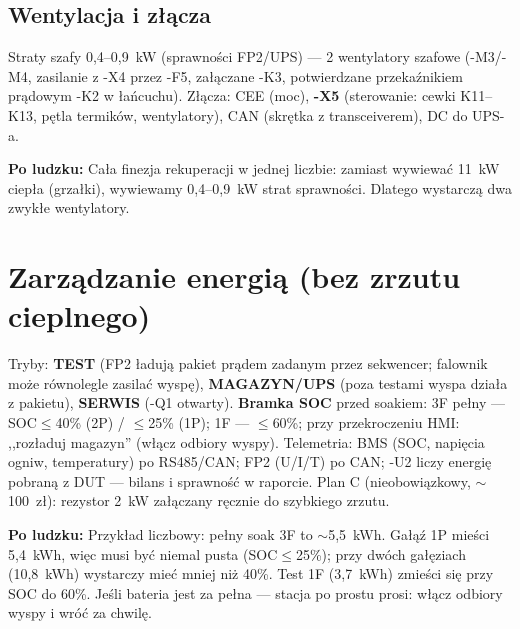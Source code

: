 \documentclass[11pt,a4paper]{article}
\newcommand{\why}[1]{\par\smallskip\noindent\colorbox{blue!6}{\parbox{0.965\linewidth}{\small\textbf{Po ludzku:} #1}}\par\smallskip}
\begin{document}
\subsection{Wentylacja i złącza}
Straty szafy 0,4--0,9~kW (sprawności FP2/UPS) --- 2 wentylatory szafowe (-M3/-M4, zasilanie z -X4
przez -F5, załączane -K3, potwierdzane przekaźnikiem prądowym -K2 w łańcuchu). Złącza: CEE (moc),
\textbf{-X5} (sterowanie: cewki K11--K13, pętla termików, wentylatory), CAN (skrętka
z transceiverem), DC do UPS-a.
\why{Cała finezja rekuperacji w jednej liczbie: zamiast wywiewać 11~kW ciepła (grzałki),
wywiewamy 0,4--0,9~kW strat sprawności. Dlatego wystarczą dwa zwykłe wentylatory.}

\section{Zarządzanie energią (bez zrzutu cieplnego)}
Tryby: \textbf{TEST} (FP2 ładują pakiet prądem zadanym przez sekwencer; falownik może równolegle
zasilać wyspę), \textbf{MAGAZYN/UPS} (poza testami wyspa działa z pakietu), \textbf{SERWIS}
(-Q1 otwarty). \textbf{Bramka SOC} przed soakiem: 3F pełny --- SOC$\le$40\% (2P) / $\le$25\% (1P);
1F --- $\le$60\%; przy przekroczeniu HMI: ,,rozładuj magazyn'' (włącz odbiory wyspy). Telemetria:
BMS (SOC, napięcia ogniw, temperatury) po RS485/CAN; FP2 (U/I/T) po CAN; -U2 liczy energię pobraną
z DUT --- bilans i sprawność w raporcie. Plan C (nieobowiązkowy, $\sim$100~zł): rezystor 2~kW
załączany ręcznie do szybkiego zrzutu.
\why{Przykład liczbowy: pełny soak 3F to $\sim$5,5~kWh. Gałąź 1P mieści 5,4~kWh, więc musi być
niemal pusta (SOC$\le$25\%); przy dwóch gałęziach (10,8~kWh) wystarczy mieć mniej niż 40\%.
Test 1F (3,7~kWh) zmieści się przy SOC do 60\%. Jeśli bateria jest za pełna --- stacja po prostu
prosi: włącz odbiory wyspy i wróć za chwilę.}
\end{document}
